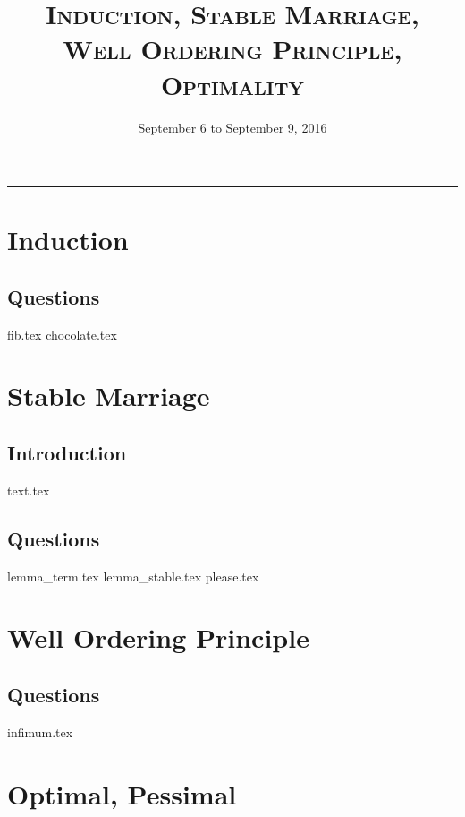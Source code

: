 \documentclass{exam}
\title{\textsc{Induction, Stable Marriage, Well Ordering Principle, Optimality}}
\date{September 6 to September 9, 2016}
\begin{document}
\maketitle
\rule{\textwidth}{0.15em}
\fontsize{12}{15}\selectfont
\thispagestyle{empty}

\section{Induction}
\subsection{Questions}
\begin{questions}
{fib.tex}
{chocolate.tex}
\end{questions}

\section{Stable Marriage}
\subsection{Introduction}
{text.tex}
\subsection{Questions}
\begin{questions}
{lemma_term.tex}
{lemma_stable.tex}
{please.tex}
\end{questions}

\section{Well Ordering Principle}
\subsection{Questions}
\begin{questions}
{infimum.tex}
\end{questions}

\section{Optimal, Pessimal}
\end{document}

